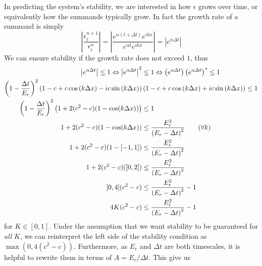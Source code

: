 \documentclass[11pt]{article}
\begin{document}
In predicting the system's stability, we are interested in how $\epsilon$ grows over time, or equivalently how the summands typically grow. In fact the growth rate of a summand is simply
\begin{equation}\label{eq:growth_rate}
\left|\frac{\epsilon^{n+1}_i}{\epsilon^n_i}\right| = \left|\frac{e^{\alpha\left(t+\Delta t\right)}e^{ikx}}{e^{\alpha t}e^{ikx}}\right| = \left|e^{\alpha\Delta t}\right|	
\end{equation}
We can ensure stability if the growth rate does not exceed $1$, thus
\begin{align}
\left|e^{\alpha\Delta t}\right|\leq 1 \Leftrightarrow
\left|e^{\alpha\Delta t}\right|^2&\leq 1 \Leftrightarrow
\left(e^{\alpha\Delta t}\right)\left(e^{\alpha\Delta t}\right)^*\leq 1 \nonumber\\
\left(1-\frac{\Delta t}{E_r}\right)^2
\left(1-c+c\cos\left(k\Delta x\right)-ic\sin\left(k\Delta x\right)\right) &
\left(1-c+c\cos\left(k\Delta x\right)+ic\sin\left(k\Delta x\right)\right)\leq 1 \nonumber\\
\left(1-\frac{\Delta t}{E_r}\right)^2\left(1+2(c^2-c)(1-\cos(k\Delta x))\right) &\leq 1 \nonumber\\
1+2(c^2-c)(1-\cos(k\Delta x)) &\leq \frac{E_r^2}{\left(E_r-\Delta t\right)^2}		\text{\quad\quad($\forall k$)} \nonumber\\
1+2(c^2-c)(1-[-1,1]) &\leq \frac{E_r^2}{\left(E_r-\Delta t\right)^2} \nonumber\\
1+2(c^2-c)([0,2]) &\leq \frac{E_r^2}{\left(E_r-\Delta t\right)^2} \nonumber\\
[0,4](c^2-c)	&\leq \frac{E_r^2}{\left(E_r-\Delta t\right)^2}-1 \nonumber \\
4K(c^2-c) &\leq \frac{E_r^2}{\left(E_r-\Delta t\right)^2}-1		\label{eq:stable}
\end{align}
for $K\in[0,1]$. Under the assumption that we want stability to be guaranteed for \emph{all} $K$, we can reinterpret the left side of the stability condition as $\max\left(0,4(c^2-c)\right)$. Furthermore, as $E_r$ and $\Delta t$ are both timescales, it is helpful to rewrite them in terms of $A=E_r/\Delta t$. This give us
\end{document}
